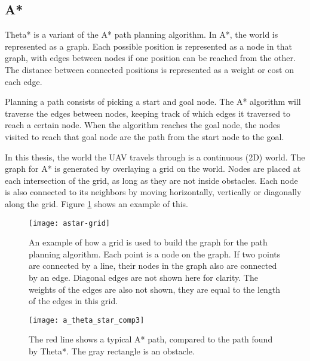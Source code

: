 \subsection{A*}
Theta* is a variant of the A* path planning algorithm. In A*, the world is represented as a graph. Each possible position is represented as a node in that graph, with edges between nodes if one position can be reached from the other. The distance between connected positions is represented as a weight or cost on each edge.
\par
Planning a path consists of picking a start and goal node. The A* algorithm will traverse the edges between nodes, keeping track of which edges it traversed to reach a certain node. When the algorithm reaches the goal node, the nodes visited to reach that goal node are the path from the start node to the goal.
\par
In this thesis, the world the UAV travels through is a continuous (2D) world. The graph for A* is generated by overlaying a grid on the world. Nodes are placed at each intersection of the grid, as long as they are not inside obstacles. Each node is also connected to its neighbors by moving horizontally, vertically or diagonally along the grid. Figure \ref{fig:astar-grid} shows an example of this.
\begin{figure}
\centering
\texttt{[image: astar-grid]}
\caption[The grid used to build the graph for the Theta* algorithm]{An example of how a grid is used to build the graph for the path planning algorithm. Each point is a node on the graph. If two points are connected by a line, their nodes in the graph also are connected by an edge. Diagonal edges are not shown here for clarity. The weights of the edges are also not shown, they are equal to the length of the edges in this grid.}
\label{fig:astar-grid}
\end{figure}

\begin{figure}[h]
\centering
\texttt{[image: a\_theta\_star\_comp3]}
\caption[A comparison between an A* and Theta* path]{The red line shows a typical A* path, compared to the path found by Theta*. The gray rectangle is an obstacle.}
\label{fig:thetastarcompare}
\end{figure}

